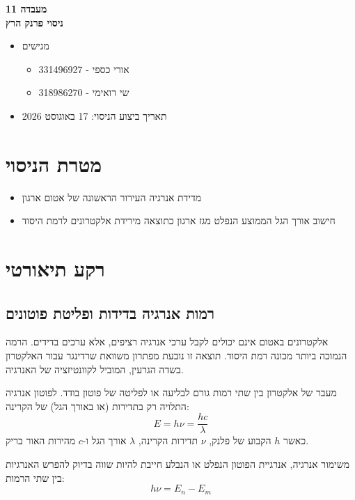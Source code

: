 \documentclass[14pt]{extarticle}
\begin{document}
\begin{center}
    {\LARGE \textbf{מעבדה 11}}\\
    {\textbf{ניסוי פרנק הרץ}}
\end{center}

\begin{itemize}
    \item מגישים
    \begin{itemize}
        \item אורי כספי - 331496927
        \item שי רואימי - 318986270
    \end{itemize}
    \item תאריך ביצוע הניסוי: 17 באוגוסט 2026
\end{itemize}

\newpage
\section*{מטרת הניסוי}

\begin{itemize}
    \item מדידת אנרגיה העירור הראשונה של אטום ארגון
    \item חישוב אורך הגל הממוצע הנפלט מגז ארגון כתוצאה מירידת אלקטרונים לרמת היסוד
\end{itemize}

\section*{רקע תיאורטי}

\subsection*{רמות אנרגיה בדידות ופליטת פוטונים}

אלקטרונים באטום אינם יכולים לקבל ערכי אנרגיה רציפים, אלא ערכים בדידים.
הרמה הנמוכה ביותר מכונה רמת היסוד. תוצאה זו נובעת מפתרון משוואת
שרדינגר עבור האלקטרון בשדה הגרעין, המוביל לקוונטיזציה של האנרגיה.

מעבר של אלקטרון בין שתי רמות גורם לבליעה או לפליטה של פוטון בודד. לפוטון אנרגיה התלויה
רק בתדירות (או באורך הגל) של הקרינה:
\begin{equation}
    E = h\nu = \frac{hc}{\lambda}
\end{equation}
כאשר $h$ הקבוע של פלנק, $\nu$ תדירות הקרינה, $\lambda$ אורך הגל ו-$c$ מהירות האור בריק.

משימור אנרגיה, אנרגיית הפוטון הנפלט או הנבלע חייבת להיות שווה בדיוק להפרש האנרגיות בין
שתי הרמות:
\begin{equation}
    h\nu = E_n - E_m
\end{equation}
\end{document}
